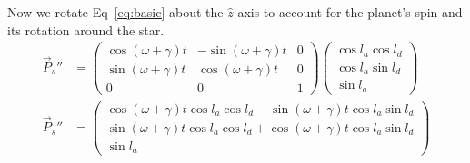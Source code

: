 \documentclass[12pt,a4paper]{article}
\begin{document}
Now we rotate Eq~\eqref{eq:basic} about the \(\hat{z}\)-axis to account for the planet's spin and its rotation around the star.
\begin{align}
\vec{P}_{s}'' &=\left(\begin{array}{ccc} \cos(\omega + \gamma)t & -\sin(\omega + \gamma) t & 0 \\ \sin(\omega+\gamma) t & \cos(\omega + \gamma) t & 0 \\ 0 & 0 & 1 \end{array} \right) \left(\begin{array}{c}\cos l_{a}\cos l_{d} \\ \cos l_{a}\sin l_{d} \\ \sin l_{a} \end{array}\right) \\
\vec{P}_{s}'' &=  \left(\begin{array}{c} \cos(\omega+\gamma)t\cos l_{a}\cos l_{d} - \sin(\omega+\gamma)t\cos l_{a}\sin l_{d} \\ \sin(\omega + \gamma)t\cos l_{a}\cos l_{d} + \cos(\omega+\gamma)t\cos l_{a}\sin l_{d} \\ \sin l_{a} \end{array}\right) \label{eq:rotated}
\end{align}
\end{document}
